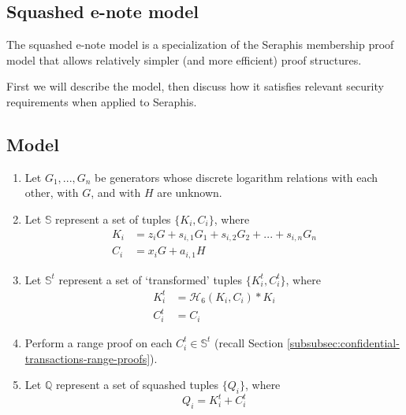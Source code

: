 \begin{appendices}

\renewcommand{\theFancyVerbLine}{%
	\textcolor{red}{\small
		\arabic{FancyVerbLine}}}

\section{Squashed e-note model}
\label{appendix:squashed-e-note-model}

The squashed e-note model is a specialization of the Seraphis membership proof model that allows relatively simpler (and more efficient) proof structures.

First we will describe the model, then discuss how it satisfies relevant security requirements when applied to Seraphis.


\subsection{Model}
\label{appendix:squashed-e-note-model-model}

\begin{enumerate}
    \item Let $G_1,...,G_n$ be generators whose discrete logarithm relations with each other, with $G$, and with $H$ are unknown.

    \item Let $\mathbb{S}$ represent a set of tuples $\{K_i, C_i\}$, where\vspace{.115cm}
    \begin{align*}
        K_i &= z_i G + s_{i,1} G_1 + s_{i,2} G_2 + ... + s_{i,n} G_n \\
        C_i &= x_i G + a_{i,1} H
    \end{align*}

    \item Let $\mathbb{S}^t$ represent a set of `transformed' tuples $\{K^t_i, C^t_i\}$, where\vspace{.115cm}
    \begin{align*}
        K^t_i &= \mathcal{H}_6(K_i, C_i)*K_i \\
        C^t_i &= C_i
    \end{align*}

    \item Perform a range proof on each $C^t_i \in \mathbb{S}^t$ (recall Section \ref{subsubsec:confidential-transactions-range-proofs}).

    \item Let $\mathbb{Q}$ represent a set of squashed tuples $\{Q_i\}$, where\vspace{.115cm}
    \[Q_i = K^t_i + C^t_i\]


\end{enumerate}
\end{appendices}
